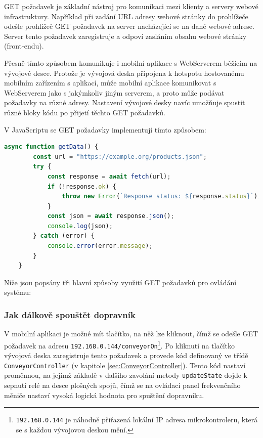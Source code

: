 GET požadavek je základní nástroj pro komunikaci mezi klienty a servery webové infrastruktury. Například při zadání URL adresy webové stránky do prohlížeče odešle prohlížeč GET požadavek na server nacházející se na dané webové adrese. Server tento požadavek zaregistruje a odpoví zasláním obsahu webové stránky (front-endu).

Přesně tímto způsobem komunikuje i mobilní aplikace s WebServerem běžícím na vývojové desce. Protože je vývojová deska připojena k hotspotu hostovanému mobilním zařízením s aplikací, může mobilní aplikace komunikovat s WebServerem jako s jakýmkoliv jiným serverem, a proto může podávat požadavky na různé adresy. Nastavení vývojové desky navíc umožňuje spustit různé bloky kódu po přijetí těchto GET požadavků.

V JavaScriptu se GET požadavky implementují tímto způsobem:
\cite{JavaScriptGET}

\begin{lstlisting}[language=JavaScript, caption={Základní způsob posílání GET požadavků v JavaScriptu }, label={lst:JavaScriptFetchFunkce}]
	async function getData() {
		const url = "https://example.org/products.json";
		try {
			const response = await fetch(url);
			if (!response.ok) {
				throw new Error(`Response status: ${response.status}`);
			}
			const json = await response.json();
			console.log(json);
		} catch (error) {
			console.error(error.message);
		}
	}
\end{lstlisting}

Níže jsou popsány tři hlavní způsoby využití GET požadavků pro ovládání systému:

\subsubsection{Jak dálkově spouštět dopravník}
V mobilní aplikaci je možné mít tlačítko, na něž lze kliknout, čímž se odešle GET požadavek na adresu \texttt{192.168.0.144/conveyorOn}\footnote{\texttt{192.168.0.144} je náhodně přiřazená lokální IP adresa mikrokontroleru, která se s každou vývojovou deskou mění.}. Po kliknutí na tlačítko vývojová deska zaregistruje tento požadavek a provede kód definovaný ve třídě \texttt{ConveyorController} (v kapitole \ref{sec:ConveyorController}). Tento kód nastaví proměnnou, na jejímž základě v dalšího zavolání metody \texttt{updateState} dojde k sepnutí relé na desce plošných spojů, čímž se na ovládací panel frekvenčního měniče nastaví vysoká logická hodnota pro spuštění dopravníku.

